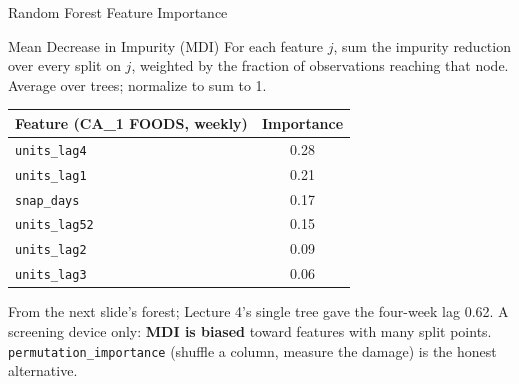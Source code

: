 \documentclass[aspectratio=169, 11pt]{beamer}
\begin{document}
\begin{frame}{Random Forest Feature Importance \parencite{Molnar2022}}
  \begin{definitionbox}{Mean Decrease in Impurity (MDI)}
    \small For each feature $j$, sum the impurity reduction over every split on $j$, weighted
    by the fraction of observations reaching that node. Average over trees; normalize to sum
    to 1.
  \end{definitionbox}
  \begin{center}
    {\small
    \begin{tabular}{lc}
      \toprule
      \textbf{Feature (CA\_1 FOODS, weekly)} & \textbf{Importance} \\
      \midrule
      \texttt{units\_lag4}  & 0.28 \\
      \texttt{units\_lag1}  & 0.21 \\
      \texttt{snap\_days}   & 0.17 \\
      \texttt{units\_lag52} & 0.15 \\
      \texttt{units\_lag2}  & 0.09 \\
      \texttt{units\_lag3}  & 0.06 \\
      \bottomrule
    \end{tabular}
    }
  \end{center}

  From the next slide's forest; Lecture 4's single tree gave the four-week lag 0.62. A screening
  device only: \textbf{MDI is biased} toward features with many split points.
  \texttt{permutation\_importance} (shuffle a column, measure the damage) is the honest
  alternative.
\end{frame}
\end{document}
